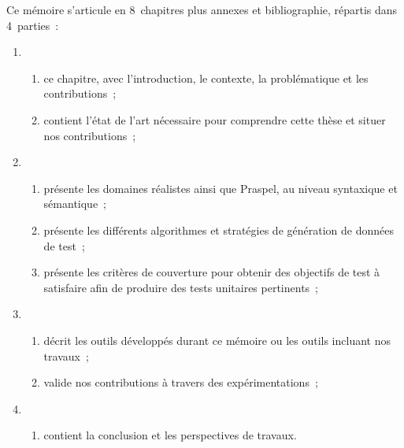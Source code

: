 Ce mémoire s'articule en 8~chapitres plus annexes et bibliographie, répartis
dans 4~parties~:
%
\begin{enumerate}

\item \begin{enumerate}

      \item ce chapitre, avec l'introduction, le contexte, la
      problématique et les contributions~;

      \item contient l'état de l'art nécessaire pour comprendre
      cette thèse et situer nos contributions~;

      \setcounter{myenum}{\theenumii}
      \end{enumerate}

\item \begin{enumerate}
      \setcounter{enumii}{\themyenum}

      \item présente les domaines réalistes ainsi que Praspel, au
      niveau syntaxique et sémantique~;

      \item présente les différents algorithmes et stratégies de génération de
      données de test~;

      \item présente les critères de couverture pour obtenir des
      objectifs de test à satisfaire afin de produire des tests unitaires
      pertinents~;

      \setcounter{myenum}{\theenumii}
      \end{enumerate}

\item \begin{enumerate}
      \setcounter{enumii}{\themyenum}

      \item décrit les outils développés durant ce mémoire ou les
      outils incluant nos travaux~;

      \item valide nos contributions à travers des
      expérimentations~;

      \setcounter{myenum}{\theenumii}
      \end{enumerate}

\item \begin{enumerate}
      \setcounter{enumii}{\themyenum}

      \item contient la conclusion et les perspectives de travaux.

      \end{enumerate}

\end{enumerate}
